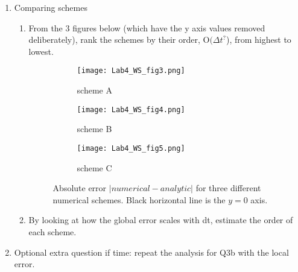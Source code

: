 \documentclass[12pt]{article}
\begin{document}
\begin{enumerate}
\item Comparing schemes
\begin{enumerate}
\item From the 3 figures below (which have the y axis values removed deliberately), rank the schemes by their order, O$(\Delta t^?$), from highest to lowest. 
\vspace{0.25in}

\begin{figure}[h!!]
     \centering
     \begin{subfigure}[b]{0.32\textwidth}
         \centering
         \texttt{[image: Lab4\_WS\_fig3.png]}
         \caption{scheme A}
         \label{fig:y equals x}
     \end{subfigure}
     \hfill
     \begin{subfigure}[b]{0.32\textwidth}
         \centering
         \texttt{[image: Lab4\_WS\_fig4.png]}
         \caption{scheme B}
         \label{fig:three sin x}
     \end{subfigure}
     \hfill
     \begin{subfigure}[b]{0.32\textwidth}
         \centering
         \texttt{[image: Lab4\_WS\_fig5.png]}
         \caption{scheme C}
         \label{fig:five over x}
     \end{subfigure}
        \caption{Absolute error $|numerical - analytic|$ for three different numerical schemes. Black horizontal line is the $y=0$ axis.}
        \label{fig:three graphs}
\end{figure}
\item By looking at how the global error scales with dt, estimate the order of each scheme. 

\vspace{0.3in}
\end{enumerate}
\item Optional extra question if time: repeat the analysis for Q3b with the local error.

\end{enumerate}
\end{document}
